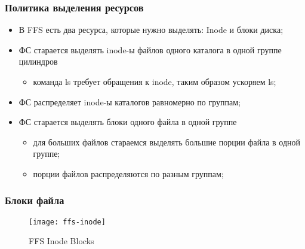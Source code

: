\begin{frame}
\frametitle{Политика выделения ресурсов}
\begin{itemize}
  \item В FFS есть два ресурса, которые нужно выделять: Inode и блоки диска;
  \item ФС старается выделять inode-ы файлов одного каталога в одной группе цилиндров
    \begin{itemize}
      \item команда ls требует обращения к inode, таким образом ускоряем ls;
    \end{itemize}
  \item ФС распределяет inode-ы каталогов равномерно по группам;
  \item ФС старается выделять блоки одного файла в одной группе
    \begin{itemize}
      \item для больших файлов стараемся выделять большие порции файла в одной группе;
      \item порции файлов распределяются по разным группам;
    \end{itemize}
\end{itemize}
\end{frame}

\begin{frame}
\frametitle{Блоки файла}
\begin{figure}
  \centering\texttt{[image: ffs-inode]}
  \caption{FFS Inode Blocks}
\end{figure}
\end{frame}
